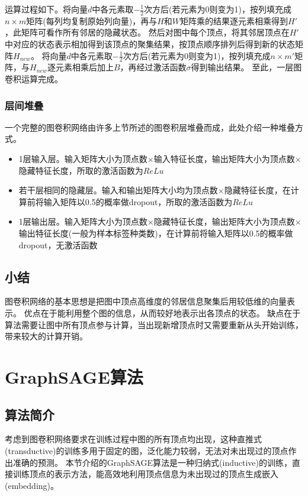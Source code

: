 运算过程如下。将向量$d$中各元素取$-\frac{1}{2}$次方后(若元素为0则变为1)，按列填充成$n\times m$矩阵(每列均复制原始列向量)，再与$H$和$W$矩阵乘的结果逐元素相乘得到$H'$，此矩阵可看作所有邻居的隐藏状态。
然后对图中每个顶点，将其邻居顶点在$H'$中对应的状态表示相加得到该顶点的聚集结果，按顶点顺序排列后得到新的状态矩阵$H_{new}$。
将向量$d$中各元素取$-\frac{1}{2}$次方后(若元素为0则变为1)，按列填充成$n\times m'$矩阵，与$H_{new}$逐元素相乘后加上$B$，再经过激活函数$\sigma$得到输出结果。
至此，一层图卷积运算完成。

\subsubsection{层间堆叠}
一个完整的图卷积网络由许多上节所述的图卷积层堆叠而成，此处介绍一种堆叠方式。

\begin{itemize}
    \item 1层输入层。输入矩阵大小为顶点数$\times$输入特征长度，输出矩阵大小为顶点数$\times$隐藏特征长度，所取的激活函数为$ReLu$
    \item 若干层相同的隐藏层。输入和输出矩阵大小均为顶点数$\times$隐藏特征长度，在计算前将输入矩阵以0.5的概率做dropout，所取的激活函数为$ReLu$
    \item 1层输出层。输入矩阵大小为顶点数$\times$隐藏特征长度，输出矩阵大小为顶点数$\times$输出特征长度(一般为样本标签种类数)，在计算前将输入矩阵以0.5的概率做dropout，无激活函数
\end{itemize}

\subsection{小结}
图卷积网络的基本思想是把图中顶点高维度的邻居信息聚集后用较低维的向量表示。
优点在于能利用整个图的信息，从而较好地表示出各顶点的状态。
缺点在于算法需要让图中所有顶点参与计算，当出现新增顶点时又需要重新从头开始训练，带来较大的计算开销。

\section{GraphSAGE算法}

\subsection{算法简介}
考虑到图卷积网络要求在训练过程中图的所有顶点均出现，这种直推式(transductive)的训练多用于固定的图，泛化能力较弱，无法对未出现过的顶点作出准确的预测。
本节介绍的GraphSAGE算法是一种归纳式(inductive)的训练，直接训练顶点的表示方法，能高效地利用顶点信息为未出现过的顶点生成嵌入(embedding)。

